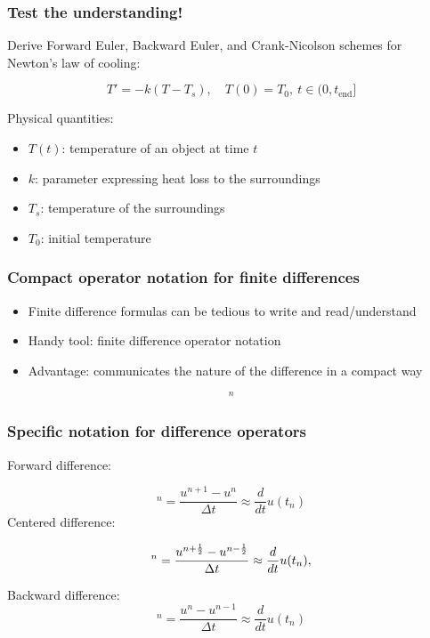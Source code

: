 \documentclass{beamer}
\begin{document}
\begin{frame}
\frametitle{Test the understanding!}

Derive Forward Euler, Backward Euler, and Crank-Nicolson schemes for
Newton's law of cooling:

\[ T' = -k(T-T_s),\quad T(0)=T_0,\ t\in (0,t_{\mbox{end}}]\]

Physical quantities:

\begin{itemize}
 \item $T(t)$: temperature of an object at time $t$

 \item $k$: parameter expressing heat loss to the surroundings

 \item $T_s$: temperature of the surroundings

 \item $T_0$: initial temperature
\end{itemize}

\noindent
\end{frame}

\begin{frame}
\frametitle{Compact operator notation for finite differences}

\label{decay:fd:op}

 

\begin{itemize}
 \item Finite difference formulas can be tedious to write and read/understand

 \item Handy tool: finite difference operator notation

 \item Advantage: communicates the nature of the difference in a compact way
\end{itemize}

\noindent
\begin{equation}
[D_t^- u  = -au]^n
\end{equation}
\end{frame}

\begin{frame}
\frametitle{Specific notation for difference operators}

Forward difference:

\begin{equation}
[D_t^+u]^n = \frac{u^{n+1} - u^{n}}{\Delta t}
\approx \frac{d}{dt} u(t_n) \label{fd:D:f}
\end{equation}
Centered difference:

\begin{equation}
[D_tu]^n = \frac{u^{n+\half} - u^{n-\half}}{\Delta t}
\approx \frac{d}{dt} u(t_n), \label{fd:D:c}
\end{equation}

Backward difference:
\begin{equation}
[D_t^-u]^n = \frac{u^{n} - u^{n-1}}{\Delta t}
\approx \frac{d}{dt} u(t_n) \label{fd:D:b}
\end{equation}
\end{frame}
\end{document}
